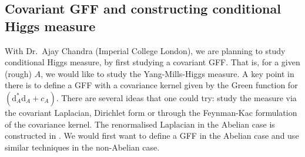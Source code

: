 \documentclass[11pt]{article}
\numberwithin{equation}{section}
\theoremstyle{definition}
\theoremstyle{remark}
\newcommand{\diff}{\mathrm{d}}
\newcommand{\1}{\mathbf 1}
\newcommand{\<}{\langle}
\renewcommand{\>}{\rangle}
\newcommand{\bT}{\mathbb T}
\begin{document}
\subsection{Covariant GFF and constructing conditional Higgs measure}
With Dr.\ Ajay Chandra (Imperial College London), we are planning to study conditional Higgs measure, by first studying a covariant GFF. That is, for a given (rough) $A$, we would like to study the Yang-Mills-Higgs measure. A key point in there is to define a GFF with 
a covariance kernel given by the Green function for $(\diff_A^*\diff_A+c_A)$. There are several ideas that one could try: study the measure via the covariant Laplacian, Dirichlet form or through the Feynman-Kac formulation of the covariance kernel. The renormalised Laplacian in the Abelian case is constructed in \cite{MM22}. We would first want to define a GFF in the Abelian case and use similar techniques in the non-Abelian case. 




\end{document}

